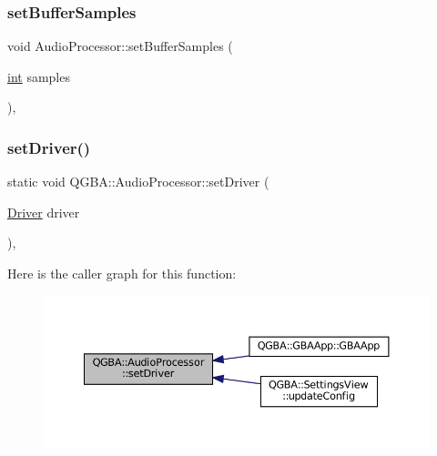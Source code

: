 \subsubsection{\texorpdfstring{set\+Buffer\+Samples}{setBufferSamples}}
{\footnotesize\ttfamily void Audio\+Processor\+::set\+Buffer\+Samples (\begin{DoxyParamCaption}\item[{\mbox{\hyperlink{ioapi_8h_a787fa3cf048117ba7123753c1e74fcd6}{int}}}]{samples }\end{DoxyParamCaption})\hspace{0.3cm}{\ttfamily [pure virtual]}, {\ttfamily [slot]}}

\mbox{\label{class_q_g_b_a_1_1_audio_processor_a7bc53e5c2ced8444d55706e449f4a6b1}} 
\subsubsection{\texorpdfstring{set\+Driver()}{setDriver()}}
{\footnotesize\ttfamily static void Q\+G\+B\+A\+::\+Audio\+Processor\+::set\+Driver (\begin{DoxyParamCaption}\item[{\mbox{\hyperlink{class_q_g_b_a_1_1_audio_processor_a49108637a6edef1b593f66701eb9b4bc}{Driver}}}]{driver }\end{DoxyParamCaption})\hspace{0.3cm}{\ttfamily [inline]}, {\ttfamily [static]}}

Here is the caller graph for this function\+:
\nopagebreak
\begin{figure}[H]
\begin{center}
\leavevmode
\includegraphics[width=350pt]{class_q_g_b_a_1_1_audio_processor_a7bc53e5c2ced8444d55706e449f4a6b1_icgraph}
\end{center}
\end{figure}
\mbox{\label{class_q_g_b_a_1_1_audio_processor_ab391c472b41b7e301b780e687c00ee8c}} 
